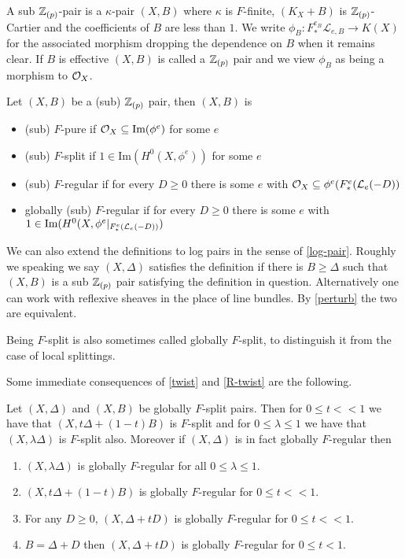 \begin{definition}
	A sub $\mathbb{Z}_{(p)}$-pair is a $\kappa$-pair $(X,B)$ where $\kappa$ is $F$-finite, $(K_{X}+B)$ is $\mathbb{Z}_{(p)}$-Cartier and the coefficients of $B$ are less than $1$. We write $\phi_{B}: F_{*}^{e_{B}}\mathcal{L}_{e,B} \to K(X)$ for the associated morphism dropping the dependence on $B$ when it remains clear. If $B$ is effective $(X,B)$ is called a $\mathbb{Z}_{(p)}$ pair and we view $\phi_{B}$ as being a morphism to $\mathcal{O}_{X}$.
	
	Let $(X,B)$ be a (sub) $\mathbb{Z}_{(p)}$ pair, then $(X,B)$ is
	\begin{itemize}
		\item (sub) $F$-pure if $\mathcal{O}_{X} \subseteq \text{Im}(\phi^{e})$ for some $e$
		\item (sub) $F$-split if $1\in\text{Im}(H^{0}(X,\phi^{e}))$ for some $e$
		\item (sub) $F$-regular if for every $D \geq 0$ there is some $e$ with $\mathcal{O}_{X} \subseteq \phi^{e}(F^{e}_{*}(\mathcal{L}_{e}(-D))$ 
		\item globally (sub) $F$-regular if for every $D \geq 0$ there is some $e$ with $1\in\textup{Im}(H^{0}(X,\phi^{e}|_{F^{e}_{*}(\mathcal{L}_{e}(-D))})$ 
	\end{itemize}
\end{definition}

\begin{remark}\label{R-Def}
	
	We can also extend the definitions to log pairs in the sense of \autoref{log-pair}. Roughly we speaking we say $(X,\Delta)$ satisfies the definition if there is $B \geq \Delta$ such that $(X,B)$ is a sub $\mathbb{Z}_{(p)}$ pair satisfying the definition in question. Alternatively one can work with reflexive sheaves in the place of line bundles. By \autoref{perturb} the two are equivalent.	
	\end{remark}

Being $F$-split is also sometimes called globally $F$-split, to distinguish it from the case of local splittings.

Some immediate consequences of \autoref{twist} and \autoref{R-twist} are the following.

\begin{lemma}\label{perturb}
	
	Let $(X,\Delta)$ and $(X,B)$ be globally $F$-split pairs. Then for $0 \leq t <<1$ we have that $(X,t\Delta+(1-t)B)$ is $F$-split and for $0 \leq \lambda \leq 1$ we have that $(X,\lambda \Delta)$ is $F$-split also. Moreover if $(X,\Delta)$ is in fact globally $F$-regular then
	
	\begin{enumerate}
		\item $(X,\lambda \Delta)$ is globally $F$-regular for all $0 \leq \lambda \leq 1$.
		\item $(X,t\Delta +(1-t)B)$ is globally $F$-regular for $0 \leq t <<1$.
		\item For any $D \geq 0$, $(X,\Delta+tD)$ is globally $F$-regular for $0 \leq t <<1$. 
		\item $B=\Delta+D$ then $(X,\Delta+tD)$ is globally $F$-regular for $0 \leq t <1$.
	\end{enumerate}

	\end{lemma}

